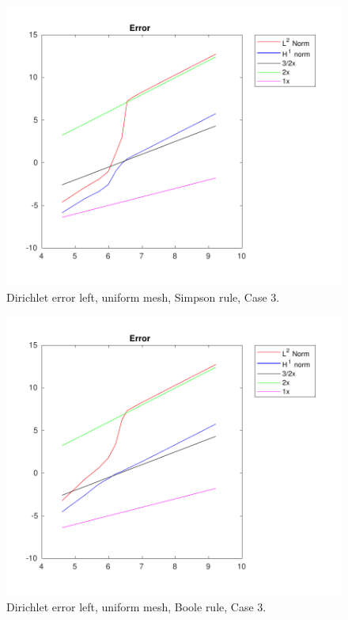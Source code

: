 \documentclass[a4paper]{article}
\numberwithin{equation}{section}
\begin{document}
\newpage
\begin{figure}[H]
\centering\includegraphics[width=13.5cm]{fig_dirichlet_error_midpoint_cp_uniform_simpson_C3_M100}
\caption{Dirichlet error left, uniform mesh, Simpson rule, Case 3.}
\end{figure}
\newpage
\begin{figure}[H]
\centering\includegraphics[width=13.5cm]{fig_dirichlet_error_midpoint_cp_uniform_boole_C3_M100}
\caption{Dirichlet error left, uniform mesh, Boole rule, Case 3.}
\end{figure}
\end{document}

